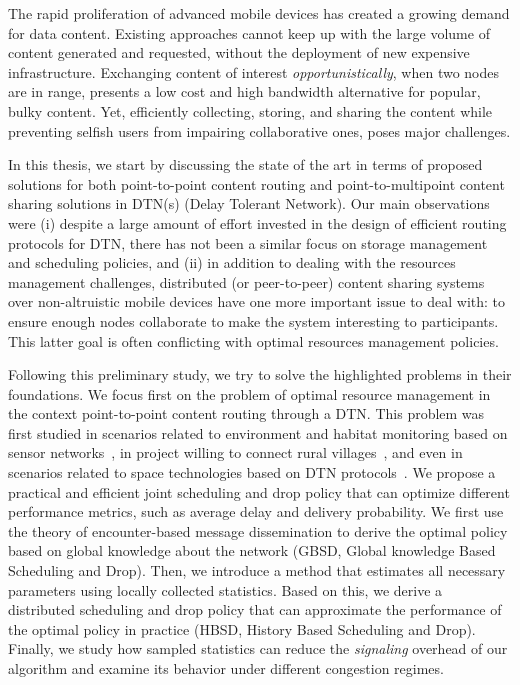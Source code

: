 \documentclass[a4paper,11pt,twoside]{ThesisStyle}
\begin{document}
The rapid proliferation of advanced mobile devices has created a growing demand for data content. Existing approaches cannot keep up with the large volume of content generated and requested, without the deployment of new expensive infrastructure. Exchanging content of interest \emph{opportunistically}, when two nodes are in range, presents a low cost and high bandwidth alternative for popular, bulky content. Yet, efficiently collecting, storing, and sharing the content while preventing selfish users from impairing collaborative ones, poses major challenges.

In this thesis, we start by discussing the state of the art in terms of proposed solutions for both point-to-point content routing and point-to-multipoint content sharing solutions in DTN(s) (Delay Tolerant Network). Our main observations were (i) despite a large amount of effort invested in the design of efficient routing protocols for DTN, there has not been a similar focus on storage management and scheduling policies, and (ii) in addition to dealing with the resources management challenges, distributed (or peer-to-peer) content sharing systems over non-altruistic mobile devices have one more important issue to deal with: to ensure enough nodes collaborate to make the system interesting to participants. This latter goal is often conflicting with optimal resources management policies. 

Following this preliminary study, we try to solve the highlighted problems in their foundations. We focus first on the problem of optimal resource management in the context point-to-point content routing through a DTN. This problem was first studied in scenarios related to environment and habitat monitoring based on sensor networks~\cite{MOMO, ARNETMINER}, in project willing to connect rural villages~\cite{ResiliNets, UMassDieselNet, KIOSKNET, BYTEWALLA, TIER}, and even in scenarios related to space technologies based on DTN protocols~\cite{BioServe, Saratoga}. We propose a practical and efficient joint scheduling and drop policy that can optimize different performance metrics, such as average delay and delivery probability. We first use the theory of encounter-based message dissemination to derive the optimal policy based on global knowledge about the network (GBSD, Global knowledge Based Scheduling and Drop). Then, we introduce a method that estimates all necessary parameters using locally collected statistics. Based on this, we derive a distributed scheduling and drop policy that can approximate the performance of the optimal policy in practice (HBSD, History Based Scheduling and Drop). Finally, we study how sampled statistics can reduce the \textit{signaling} overhead of our algorithm and examine its behavior under different congestion regimes. 
\end{document}
